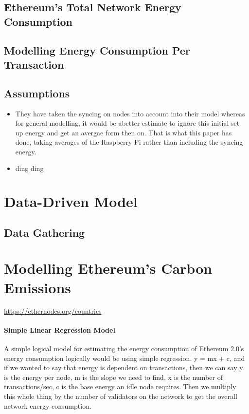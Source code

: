 \subsection{Ethereum's Total Network Energy Consumption}

\subsection {Modelling Energy Consumption Per Transaction}

\subsection{Assumptions}

\begin{itemize}
    \item They have taken the syncing on nodes into account into their model whereas for general modelling, it would be  abetter estimate to ignore this initial set up energy and get an avergae form then on. That is what this paper has done, taking averages of the Raspberry Pi rather than including the syncing energy.
    \item ding ding
\end{itemize}


\section{ Data-Driven Model}
\subsection{Data Gathering}






\section {Modelling Ethereum's Carbon Emissions}
\url{https://ethernodes.org/countries}

\paragraph{ Simple Linear Regression Model}
A simple logical model for estimating the energy consumption of Ethereum 2.0's energy consumption logically would be using simple regression. y = mx + c, and if we wanted to say that energy is dependent on transactions, then we can say y is the energy per node, m is the slope we need to find, x is the number of transactions/sec, c is the base energy an idle node requires. Then we multiply this whole thing by the number of validators on the network to get the overall network energy consumption.


